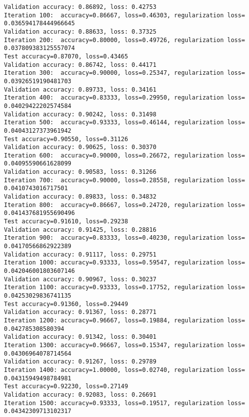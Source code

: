 \documentclass[11pt]{article}
\begin{document}
\begin{Verbatim}[commandchars=\\\{\}]
Validation accuracy: 0.86892, loss: 0.42753
Iteration 100:	accuracy=0.86667, loss=0.46303, regularization loss= 0.036594178444966645
Validation accuracy: 0.88633, loss: 0.37325
Iteration 200:	accuracy=0.80000, loss=0.49726, regularization loss= 0.037809383125557074
Test accuracy=0.87070, loss=0.43465
Validation accuracy: 0.86742, loss: 0.44171
Iteration 300:	accuracy=0.90000, loss=0.25347, regularization loss= 0.03926519190481703
Validation accuracy: 0.89733, loss: 0.34161
Iteration 400:	accuracy=0.83333, loss=0.29950, regularization loss= 0.04029422202574584
Validation accuracy: 0.90242, loss: 0.31498
Iteration 500:	accuracy=0.93333, loss=0.46144, regularization loss= 0.04043127373961942
Test accuracy=0.90550, loss=0.31126
Validation accuracy: 0.90625, loss: 0.30370
Iteration 600:	accuracy=0.90000, loss=0.26672, regularization loss= 0.04095590661628099
Validation accuracy: 0.90583, loss: 0.31266
Iteration 700:	accuracy=0.90000, loss=0.28558, regularization loss= 0.0410743016717501
Validation accuracy: 0.89833, loss: 0.34832
Iteration 800:	accuracy=0.86667, loss=0.24720, regularization loss= 0.041437681955690496
Test accuracy=0.91610, loss=0.29238
Validation accuracy: 0.91425, loss: 0.28816
Iteration 900:	accuracy=0.83333, loss=0.40230, regularization loss= 0.04170566862922389
Validation accuracy: 0.91117, loss: 0.29751
Iteration 1000:	accuracy=0.93333, loss=0.59547, regularization loss= 0.042046001803607146
Validation accuracy: 0.90967, loss: 0.30237
Iteration 1100:	accuracy=0.93333, loss=0.17752, regularization loss= 0.04253029836741135
Test accuracy=0.91360, loss=0.29449
Validation accuracy: 0.91367, loss: 0.28771
Iteration 1200:	accuracy=0.96667, loss=0.19884, regularization loss= 0.042785308580394
Validation accuracy: 0.91342, loss: 0.30401
Iteration 1300:	accuracy=0.96667, loss=0.15347, regularization loss= 0.04306964078714564
Validation accuracy: 0.91267, loss: 0.29789
Iteration 1400:	accuracy=1.00000, loss=0.02740, regularization loss= 0.04315949498784981
Test accuracy=0.92230, loss=0.27149
Validation accuracy: 0.92083, loss: 0.26691
Iteration 1500:	accuracy=0.93333, loss=0.19517, regularization loss= 0.04342309713102317

    \end{Verbatim}
\end{document}
